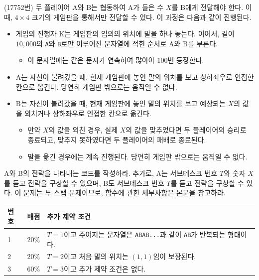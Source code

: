 \begin{problem}
    (17752번) 두 플레이어 A와 B는 협동하여 A가 들은 수 $X$를 B에게 전달해야 한다. 이때, $4 \times 4$ 크기의 게임판을 통해서만 전달할 수 있다. 이 과정은 다음과 같이 진행된다.
    \begin{itemize}
        \item 게임의 진행자 K는 게임판의 임의의 위치에 말을 하나 놓는다. 이어서, 길이 $10,000$의 \texttt{A}와 \texttt{B}로만 이루어진 문자열에 적힌 순서로 A와 B를 부른다.
        \begin{itemize}
            \item 이 문자열에는 같은 문자가 연속하여 많아야 $100$번 등장한다.
        \end{itemize}
        \item A는 자신이 불려갔을 때, 현재 게임판에 놓인 말의 위치를 보고 상하좌우로 인접한 칸으로 옮긴다. 당연히 게임판 밖으로는 움직일 수 없다.
        \item B는 자신이 불려갔을 때, 현재 게임판에 놓인 말의 위치를 보고 예상되는 $X$의 값을 외치거나 상하좌우로 인접한 칸으로 옮긴다. \begin{itemize}
            \item 만약 $X$의 값을 외친 경우, 실제 $X$의 값을 맞추었다면 두 플레이어의 승리로 종료되고, 맞추지 못하였다면 두 플레이어의 패배로 종료된다.
            \item 말을 옮긴 경우에는 계속 진행된다. 당연히 게임판 밖으로는 움직일 수 없다.
        \end{itemize}
    \end{itemize}
    A와 B의 전략을 나타내는 코드를 작성하라. 추가로, A는 서브테스크 번호 $T$와 숫자 $X$를 듣고 전략을 구상할 수 있으며, B도 서브테스크 번호 $T$를 듣고 전략을 구상할 수 있다. 이 문제는 투 스탭 문제이므로, 함수에 관한 세부사항은 본문을 참고하라.
    \begin{center}
    \begin{tabular}{ | m{} | m{} | m{} | } 
        \hline
        번호 & 배점 & 추가 제약 조건 \\ 
        \hline
        1 & 20\% & $T=1$이고 주어지는 문자열은 \texttt{ABAB...}과 같이 \texttt{AB}가 반복되는 형태이다. \\ 
        \hline
        2 & 20\% & $T=2$이고 처음 말의 위치는 $(1, 1)$임이 보장된다. \\ 
        \hline
        3 & 60\% & $T=3$이고 추가 제약 조건은 없다. \\
        \hline
    \end{tabular}
    \end{center}
\end{problem}

